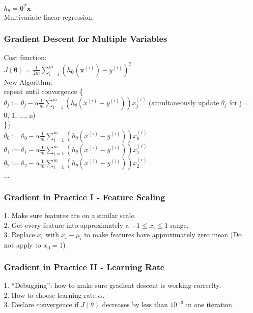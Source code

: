 \documentclass{article}
\newcommand\tab[1][1cm]{\hspace*{#1}}
\newcommand{\vect}[1]{\boldsymbol{#1}}
\begin{document}
$h_\theta = \vect{\theta}^T \vect{x}$\\
Multivariate linear regression. 

\subsubsection{Gradient Descent for Multiple Variables}
Cost function:\\
$J(\vect{\theta}) = \frac{1}{2m} \sum_{i=1}^{m}(h_{\vect{\theta}}(\vect{x}^{(i)}) - y^{(i)})^2$\\

New Algorithm:\\
repeat until convergence \{\\
\tab $\theta_j := \theta_j - \alpha \frac{1}{m} \sum_{i=1}^{m}(h_\theta(x^{(i)} - y^{(i)})) x_{j}^{(i)}$ (simultaneously update $\theta_j$ for j = 0, 1, ..., n) \\
\}\}\\

$\theta_0 := \theta_0 - \alpha \frac{1}{m} \sum_{i=1}^{m}(h_\theta(x^{(i)} - y^{(i)})) x_{0}^{(i)}$ \\
$\theta_1 := \theta_1 - \alpha \frac{1}{m} \sum_{i=1}^{m}(h_\theta(x^{(i)} - y^{(i)})) x_{1}^{(i)}$ \\
$\theta_2 := \theta_2 - \alpha \frac{1}{m} \sum_{i=1}^{m}(h_\theta(x^{(i)} - y^{(i)})) x_{2}^{(i)}$ \\
...

\subsubsection{Gradient in Practice I - Feature Scaling}
1. Make sure features are on a similar scale. \\
2. Get every feature into approximately a $-1 \le x_i \le 1$ range. \\
3. Replace $x_i$ with $x_i - \mu_i$ to make features have approximately zero mean (Do not apply to $x_0 = 1$)

\subsubsection{Gradient in Practice II - Learning Rate}
1. ``Debugging'': how to make sure gradient descent is working correclty. \\
2. How to choose learning rate $\alpha$. \\
3. Declare convergence if $J(\theta)$ decreases by less than $10^{-3}$ in one iteration. \\
\end{document}

